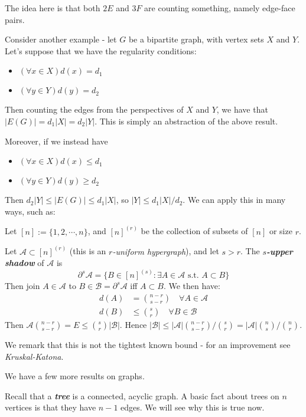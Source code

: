 \documentclass[]{article}
\theoremstyle{custhm}
\theoremstyle{cusdef}
\theoremstyle{custhm}
\theoremstyle{custhm}
\theoremstyle{custhm}
\theoremstyle{custhm}
\theoremstyle{cusdef}
\theoremstyle{remark}
\newcommand{\undf}[1]{\textit{\textbf{#1}}}
\renewcommand{\it}[1]{\textit{#1}}
\begin{document}
The idea here is that both $2E$ and $3F$ are counting something, namely edge-face pairs.

Consider another example - let $G$ be a bipartite graph, with vertex sets $X$ and $Y$. Let's suppose that we have the regularity conditions:
\begin{itemize}
	\item $(\forall x\in X)d(x) = d_1$
	\item $(\forall y\in Y)d(y) = d_2$
\end{itemize}

Then counting the edges from the perspectives of $X$ and $Y$, we have that $|E(G)| = d_1|X| = d_2|Y|$. This is simply an abstraction of the above result.

Moreover, if we instead have
\begin{itemize}
	\item $(\forall x\in X)d(x) \le d_1$
	\item $(\forall y\in Y)d(y) \ge d_2$
\end{itemize}

Then $d_2|Y| \le |E(G)| \le d_1|X|$, so $|Y| \le d_1|X|/d_2$. We can apply this in many ways, such as:

Let $[n] := \{1,2,\cdots,n\}$, and $[n]^{(r)}$ be the collection of subsets of $[n]$ or size $r$.

Let $\mathcal{A} \subset [n]^{(r)}$ (this is an \it{$r$-uniform hypergraph}), and let $s > r$. The \undf{$s$-upper shadow} of $\mathcal{A}$ is
\[
\partial^s\mathcal{A} = \{B\in[n]^{(s)}: \exists A\in \mathcal{A} \textrm{ s.t. } A\subset B\}
\]
Then join $A\in \mathcal{A}$ to $B\in \mathcal{B} = \partial^s\mathcal{A}$ iff $A\subset B$. We then have:
\begin{align*}
	d(A) &= {n-r \choose s-r}\quad \forall A\in \mathcal{A}\\
	d(B) &\le {s \choose r}\quad \forall B\in \mathcal{B}
\end{align*}
Then $\mathcal{A} {n-r \choose s-r} = E \le {s \choose r}|\mathcal{B}|$. Hence $|\mathcal{B}| \le |\mathcal{A}|{n-r \choose s-r}/{s \choose r} = |\mathcal{A}| {n \choose s}/{n \choose r}$.

We remark that this is not the tightest known bound - for an improvement see \it{Kruskal-Katona}.

We have a few more results on graphs.

Recall that a \undf{tree} is a connected, acyclic graph. A basic fact about trees on $n$ vertices is that they have $n-1$ edges. We will see why this is true now.
\end{document}
